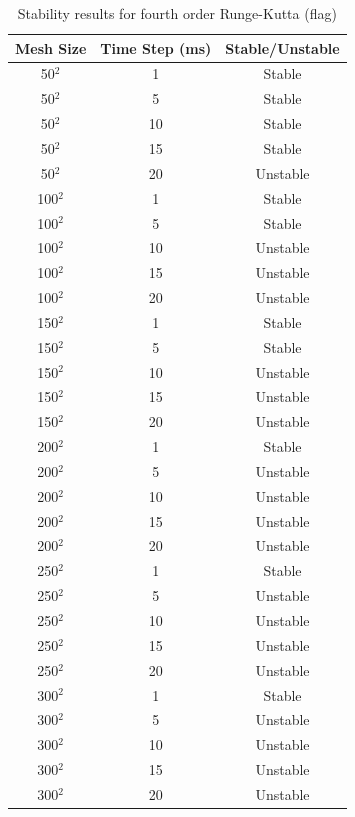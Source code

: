 \begin{table}[tp]
   \begin{minipage}{\textwidth}
      \begin{center}
         \begin{tabular}{|c|c|c|}
         \hline
           Mesh Size & Time Step (ms) & Stable/Unstable\\
           \hline
           50$^{2}$ & 1 & Stable\\ \hline
           50$^{2}$ & 5 & Stable\\ \hline
           50$^{2}$ & 10 & Stable\\ \hline
           50$^{2}$ & 15 & Stable\\ \hline
           50$^{2}$ & 20 & Unstable\\ \hline
           100$^{2}$ & 1 & Stable\\ \hline
           100$^{2}$ & 5 & Stable\\ \hline
           100$^{2}$ & 10 & Unstable\\ \hline
           100$^{2}$ & 15 & Unstable\\ \hline
           100$^{2}$ & 20 & Unstable\\ \hline           
           150$^{2}$ & 1 & Stable\\ \hline
           150$^{2}$ & 5 & Stable\\ \hline
           150$^{2}$ & 10 & Unstable\\ \hline
           150$^{2}$ & 15 & Unstable\\ \hline
           150$^{2}$ & 20 & Unstable\\ \hline           
           200$^{2}$ & 1 & Stable\\ \hline
           200$^{2}$ & 5 & Unstable\\ \hline
           200$^{2}$ & 10 & Unstable\\ \hline
           200$^{2}$ & 15 & Unstable\\ \hline
           200$^{2}$ & 20 & Unstable\\ \hline           
           250$^{2}$ & 1 & Stable\\ \hline
           250$^{2}$ & 5 & Unstable\\ \hline
           250$^{2}$ & 10 & Unstable\\ \hline
           250$^{2}$ & 15 & Unstable\\ \hline
           250$^{2}$ & 20 & Unstable\\ \hline           
           300$^{2}$ & 1 & Stable\\ \hline
           300$^{2}$ & 5 & Unstable\\ \hline
           300$^{2}$ & 10 & Unstable\\ \hline
           300$^{2}$ & 15 & Unstable\\ \hline
           300$^{2}$ & 20 & Unstable\\ \hline
         \end{tabular}
      \end{center}
   \end{minipage}
   \caption{Stability results for fourth order Runge-Kutta (flag)}
   \label{tab:rk4 stability flag}
\end{table}


